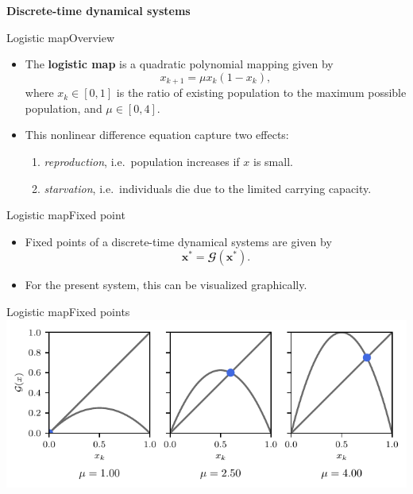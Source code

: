 \documentclass[usenames,dvipsnames,svgnames,10pt,aspectratio=169]{beamer}
\begin{document}
\begin{frame}[t, c]{}
	\centering
	\vspace{1cm}

	{\Large \textbf{Discrete-time dynamical systems}}

	\bigskip

	{}

\end{frame}

\begin{frame}[t, c]{Logistic map}{Overview}
	\begin{itemize}
		\item The \alert{\textbf{logistic map}} is a quadratic polynomial mapping given by
		$$x_{k+1} = \mu x_k ( 1 - x_k),$$
		where $x_k \in \left[ 0, 1 \right]$ is the ratio of existing population to the maximum possible population, and $\mu \in \left[ 0 , 4 \right]$.

		\bigskip

		\item This nonlinear difference equation capture two effects:
		\begin{enumerate}
			\item \emph{reproduction}, i.e.\ population increases if $x$ is small.
			\item \emph{starvation}, i.e.\ individuals die due to the limited carrying capacity.
		\end{enumerate}
	\end{itemize}

	\vspace{1cm}
\end{frame}

\begin{frame}[t, c]{Logistic map}{Fixed point}
	\begin{itemize}
		\item Fixed points of a discrete-time dynamical systems are given by
		$$\mathbf{x}^* = \mathbfcal{G} \left( \mathbf{x}^* \right).$$

		\bigskip

		\item For the present system, this can be visualized graphically.
	\end{itemize}

	\vspace{1cm}
\end{frame}

\begin{frame}[t, c]{Logistic map}{Fixed points}
	\centering
	\includegraphics[width=.75\textwidth]{logistic_map_fixed_points}

	\vspace{1cm}
\end{frame}
\end{document}
